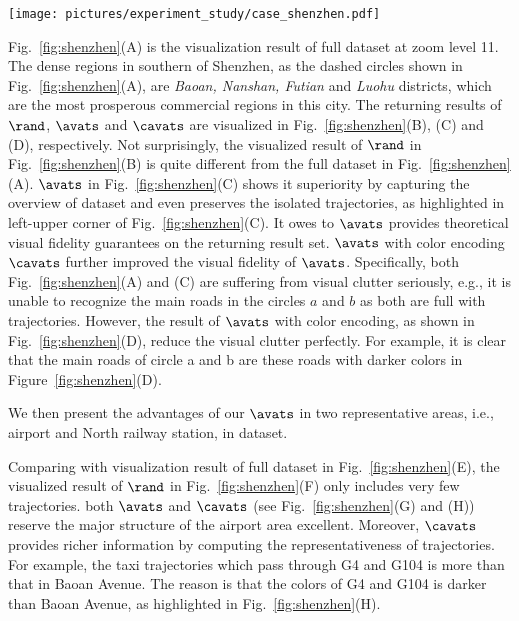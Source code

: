 \begin{figure*}[t]
	\centering
	\texttt{[image: pictures/experiment\_study/case\_shenzhen.pdf]}
	\vspace{-4mm}
	\caption{Case studies on \sz{} taxi trajectory dataset, sampling rate $\alpha = 1\%$.}
	\label{fig:shenzhen}
	\vspace{-3mm}
\end{figure*}

Fig.~\ref{fig:shenzhen}(A) is the visualization result of full \sz{} dataset at zoom level 11.
The dense regions in southern of Shenzhen, as the dashed circles shown in Fig.~\ref{fig:shenzhen}(A), are \emph{Baoan, Nanshan, Futian} and \emph{Luohu} districts,
which are the most prosperous commercial regions in this city.
The returning results of $\rand$, $\avats$ and $\cavats$ are visualized in Fig.~\ref{fig:shenzhen}(B), (C) and (D), respectively.
Not surprisingly,  the visualized result of $\rand$ in Fig.~\ref{fig:shenzhen}(B) is quite different from the full dataset in Fig.~\ref{fig:shenzhen}(A).
$\avats$ in Fig.~\ref{fig:shenzhen}(C) shows it superiority by capturing the overview of \sz{} dataset and even preserves the isolated trajectories,
as highlighted in left-upper corner of Fig.~\ref{fig:shenzhen}(C).
It owes to $\avats$ provides theoretical visual fidelity guarantees on the returning result set.
$\avats$ with color encoding $\cavats$ further improved the visual fidelity of $\avats$.
Specifically, both Fig.~\ref{fig:shenzhen}(A) and (C) are suffering from visual clutter seriously,
e.g., it is unable to recognize the main roads in the circles $a$ and $b$ as both are full with trajectories.
However, the result of $\avats$ with color encoding, as shown in Fig.~\ref{fig:shenzhen}(D), reduce the visual clutter perfectly.
For example, it is clear that the main roads of circle a and b are these roads with {darker} colors in Figure~\ref{fig:shenzhen}(D).

We then present the advantages of our $\avats$ in two representative areas, i.e., airport and North railway station, in \sz{} dataset.

Comparing with visualization result of full dataset in Fig.~\ref{fig:shenzhen}(E),
the visualized result of $\rand$ in Fig.~\ref{fig:shenzhen}(F) only includes very few trajectories.
both $\avats$ and $\cavats$ (see Fig.~\ref{fig:shenzhen}(G) and (H)) reserve the major structure of the airport area excellent.
Moreover, $\cavats$ provides richer information by computing the representativeness of trajectories.
For example, the taxi trajectories which pass through G4 and G104 is more than that in Baoan Avenue.
The reason is that the colors of G4 and G104 is {darker} than Baoan Avenue, as highlighted in Fig.~\ref{fig:shenzhen}(H).


